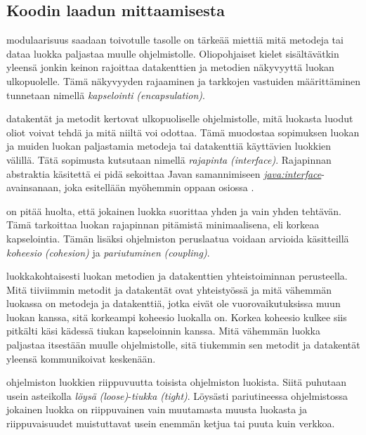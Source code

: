 \documentclass[a4paper,justified,notoc]{tufte-book}
\newcommand{\eng}[1]{\textit{(#1)}}
\newcommand{\new}[1]{\textit{\gls{#1}}}
\newcommand{\newnogls}[1]{\textit{#1}}
\newcommand{\neweng}[2]{\new{#1} \eng{#2}}
\newcommand{\newengnogls}[2]{\newnogls{#1} \eng{#2}}
\newcommand{\java}[1]{\underline{\gls{java:#1}}}
\newcommand{\newjava}[1]{\textit{\java{#1}}}
\begin{document}
\begin{fullwidth}

\section{Koodin laadun mittaamisesta}
\label{koodin laadusta}

 modulaarisuus saadaan toivotulle tasolle on tärkeää miettiä mitä
metodeja tai dataa luokka paljastaa muulle ohjelmistolle. Oliopohjaiset kielet sisältävätkin
yleensä jonkin keinon rajoittaa datakenttien ja metodien näkyvyyttä luokan ulkopuolelle. Tämä
näkyvyyden rajaaminen ja tarkkojen vastuiden määrittäminen tunnetaan nimellä
\neweng{kapselointi}{encapsulation}.

 datakentät ja metodit kertovat ulkopuoliselle ohjelmistolle, mitä
luokasta luodut oliot voivat tehdä ja mitä niiltä voi odottaa. Tämä muodostaa sopimuksen luokan ja
muiden luokan paljastamia metodeja tai datakenttiä käyttävien luokkien välillä. Tätä sopimusta
kutsutaan nimellä \neweng{rajapinta}{interface}. Rajapinnan abstraktia käsitettä ei pidä sekoittaa
Javan samannimiseen \newjava{interface}-avainsanaan, joka esitellään myöhemmin oppaan osiossa
.

 on pitää huolta, että jokainen luokka
suorittaa yhden ja vain yhden tehtävän. Tämä tarkoittaa luokan rajapinnan pitämistä minimaalisena,
eli korkeaa kapselointia. Tämän lisäksi ohjelmiston peruslaatua voidaan arvioida käsitteillä
\neweng{koheesio}{cohesion} ja \neweng{pariutuminen}{coupling}.

 luokkakohtaisesti luokan metodien ja datakenttien
yhteistoiminnan perusteella. Mitä tiiviimmin metodit ja datakentät ovat yhteistyössä ja mitä
vähemmän luokassa on metodeja ja datakenttiä, jotka eivät ole vuorovaikutuksissa muun luokan
kanssa, sitä korkeampi koheesio luokalla on. Korkea koheesio kulkee siis pitkälti käsi kädessä
tiukan kapseloinnin kanssa. Mitä vähemmän luokka paljastaa itsestään muulle ohjelmistolle, sitä
tiukemmin sen metodit ja datakentät yleensä kommunikoivat keskenään.

 ohjelmiston luokkien riippuvuutta toisista ohjelmiston
luokista. Siitä puhutaan usein asteikolla \newengnogls{löysä}{loose}-\newengnogls{tiukka}{tight}.
Löysästi pariutineessa ohjelmistossa jokainen luokka on riippuvainen vain muutamasta muusta
luokasta ja riippuvaisuudet muistuttavat usein enemmän ketjua tai puuta kuin verkkoa.


\end{fullwidth}
\end{document}
